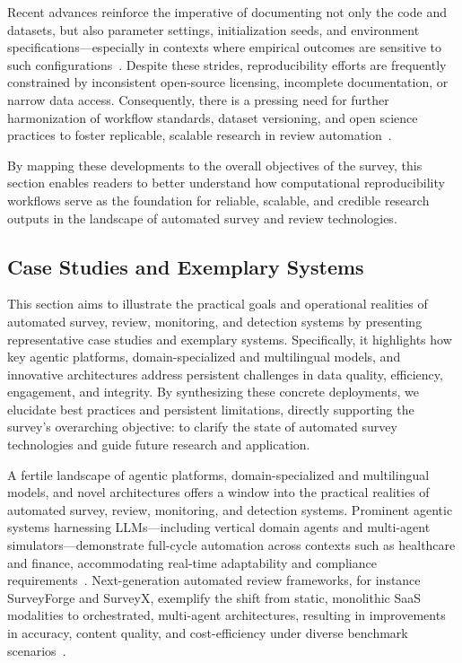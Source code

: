 \documentclass[sigconf]{acmart}
\begin{document}
Recent advances reinforce the imperative of documenting not only the code and datasets, but also parameter settings, initialization seeds, and environment specifications—especially in contexts where empirical outcomes are sensitive to such configurations~\cite{ref92,ref100,ref112}. Despite these strides, reproducibility efforts are frequently constrained by inconsistent open-source licensing, incomplete documentation, or narrow data access. Consequently, there is a pressing need for further harmonization of workflow standards, dataset versioning, and open science practices to foster replicable, scalable research in review automation~\cite{ref113,ref114,ref115}.

By mapping these developments to the overall objectives of the survey, this section enables readers to better understand how computational reproducibility workflows serve as the foundation for reliable, scalable, and credible research outputs in the landscape of automated survey and review technologies.

\subsection{Case Studies and Exemplary Systems}

This section aims to illustrate the practical goals and operational realities of automated survey, review, monitoring, and detection systems by presenting representative case studies and exemplary systems. Specifically, it highlights how key agentic platforms, domain-specialized and multilingual models, and innovative architectures address persistent challenges in data quality, efficiency, engagement, and integrity. By synthesizing these concrete deployments, we elucidate best practices and persistent limitations, directly supporting the survey’s overarching objective: to clarify the state of automated survey technologies and guide future research and application.

A fertile landscape of agentic platforms, domain-specialized and multilingual models, and novel architectures offers a window into the practical realities of automated survey, review, monitoring, and detection systems. Prominent agentic systems harnessing LLMs—including vertical domain agents and multi-agent simulators—demonstrate full-cycle automation across contexts such as healthcare and finance, accommodating real-time adaptability and compliance requirements~\cite{ref85,ref86,ref87,ref90,ref91,ref92,ref93,ref94,ref95}. Next-generation automated review frameworks, for instance SurveyForge and SurveyX, exemplify the shift from static, monolithic SaaS modalities to orchestrated, multi-agent architectures, resulting in improvements in accuracy, content quality, and cost-efficiency under diverse benchmark scenarios~\cite{ref87,ref98,ref99,ref100,ref104,ref105}.
\end{document}
